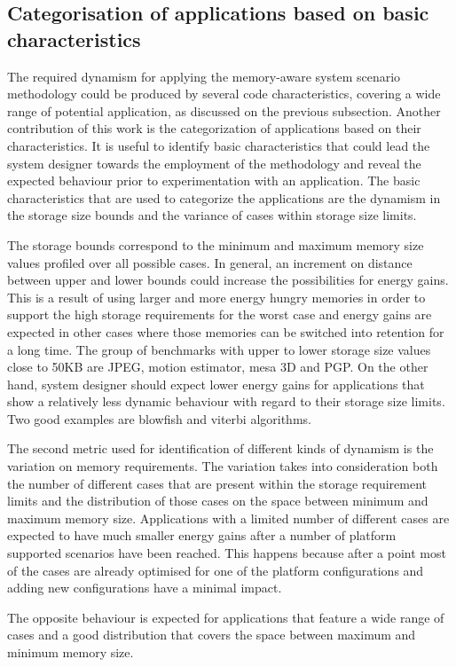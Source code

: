 \documentclass[a4paper,conference]{IEEEtran}
\begin{document}
\subsection{Categorisation of applications based on basic characteristics}
\label{sec:categorisation}
The required dynamism for applying the memory-aware system scenario methodology could be produced by several code characteristics, covering a wide range of potential application, as discussed on the previous subsection. Another contribution of this work is the categorization of applications based on their characteristics. It is useful to identify basic characteristics that could lead the system designer towards the employment of the methodology and reveal the expected behaviour prior to experimentation with an application. The basic characteristics that are used to categorize the applications are the dynamism in the storage size bounds and the variance of cases within storage size limits.

The storage bounds correspond to the minimum and maximum memory size values profiled over all possible cases. In general, an increment on distance between upper and lower bounds could increase the possibilities for energy gains. This is a result of using larger and more energy hungry memories in order to support the high storage requirements for the worst case and energy gains are expected in other cases where those memories can be switched into retention for a long time. The group of benchmarks with upper to lower storage size values close to 50KB are JPEG, motion estimator, mesa 3D and PGP. On the other hand, system designer should expect lower energy gains for applications that show a relatively less dynamic behaviour with regard to their storage size limits. Two good examples are blowfish and viterbi algorithms. 

The second metric used for identification of different kinds of dynamism is the variation on memory requirements. The variation takes into consideration both the number of different cases that are present within the storage requirement limits and the distribution of those cases on the space between minimum and maximum memory size. Applications with a limited number of different cases are expected to have much smaller energy gains after a number of platform supported scenarios have been reached. This happens because after a point most of the cases are already optimised for one of the platform configurations and adding new configurations have a minimal impact.

The opposite behaviour is expected for applications that feature a wide range of cases and a good distribution that covers the space between maximum and minimum memory size.
\end{document}
